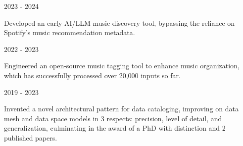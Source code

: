 

\begin{cventries}


  \cventrythin
    {} %
    {2023 - 2024} %
    {
          \begin{cvitems} %
	        \item {Developed an early AI/LLM music discovery tool, bypassing the reliance on Spotify's music recommendation metadata.}
	      \end{cvitems}
    }


  \cventrythin
    {} %
    {2022 - 2023} %
    {
          \begin{cvitems} %
	        \item {Engineered an open-source music tagging tool to enhance music organization, which has successfully processed over 20,000 inputs so far.}
	      \end{cvitems}
    }




  \cventrythin
    {} %
    {2019 - 2023} %
    {
          \begin{cvitems} %
			\item {Invented a novel architectural pattern for data cataloging, improving on data mesh and data space models in 3 respects: precision, level of detail, and generalization, culminating in the award of a PhD with distinction and 2 published papers.}
	      \end{cvitems}
    }



\end{cventries}
